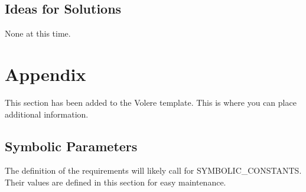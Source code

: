 \documentclass[12pt, titlepage]{article}
\begin{document}
\subsection{Ideas for Solutions}
	None at this time.




\newpage

\section{Appendix}

This section has been added to the Volere template.  This is where you can place
additional information.

\subsection{Symbolic Parameters}

The definition of the requirements will likely call for SYMBOLIC\_CONSTANTS.
Their values are defined in this section for easy maintenance.
\end{document}
